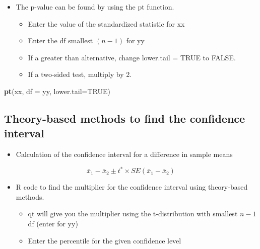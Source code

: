 \documentclass[
]{report}
\newenvironment{Shaded}{\begin{snugshade}}{\end{snugshade}}
\newcommand{\AttributeTok}[1]{\textcolor[rgb]{0.13,0.29,0.53}{#1}}
\newcommand{\ConstantTok}[1]{\textcolor[rgb]{0.56,0.35,0.01}{#1}}
\newcommand{\FunctionTok}[1]{\textcolor[rgb]{0.13,0.29,0.53}{\textbf{#1}}}
\newcommand{\NormalTok}[1]{#1}
\providecommand{\tightlist}{%
  \setlength{\itemsep}{0pt}\setlength{\parskip}{0pt}}
\begin{document}
\begin{itemize}
\item
  The p-value can be found by using the pt function.

  \begin{itemize}
  \item
    Enter the value of the standardized statistic for xx
  \item
    Enter the df smallest \((n-1)\) for yy
  \item
    If a greater than alternative, change lower.tail = TRUE to FALSE.
  \item
    If a two-sided test, multiply by 2.
  \end{itemize}
\end{itemize}

\begin{Shaded}
\begin{Highlighting}[]
\FunctionTok{pt}\NormalTok{(xx, }\AttributeTok{df =}\NormalTok{ yy, }\AttributeTok{lower.tail=}\ConstantTok{TRUE}\NormalTok{)}
\end{Highlighting}
\end{Shaded}

\subsection*{Theory-based methods to find the confidence interval}\label{theory-based-methods-to-find-the-confidence-interval}

\begin{itemize}
\tightlist
\item
  Calculation of the confidence interval for a difference in sample means
\end{itemize}

\[\bar{x}_1-\bar{x}_2\pm t^*\times SE(\bar{x}_1-\bar{x}_2)\]

\begin{itemize}
\item
  R code to find the multiplier for the confidence interval using theory-based methods.

  \begin{itemize}
  \item
    qt will give you the multiplier using the t-distribution with smallest \(n-1\) df (enter for yy)
  \item
    Enter the percentile for the given confidence level
  \end{itemize}
\end{itemize}
\end{document}
